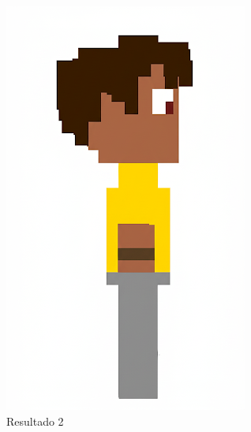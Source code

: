 \begin{figure}[htbp]
\begin{subfigure}{0.23\linewidth}
        \includegraphics[width=1\linewidth]{figs/geminiPro/chat6/tela2_res2.png}
        \caption{\small Resultado 2}
        \label{fig:geminiPro18b}
    \end{subfigure}
    \begin{subfigure}{0.23\linewidth}

\end{subfigure}
\end{figure}
